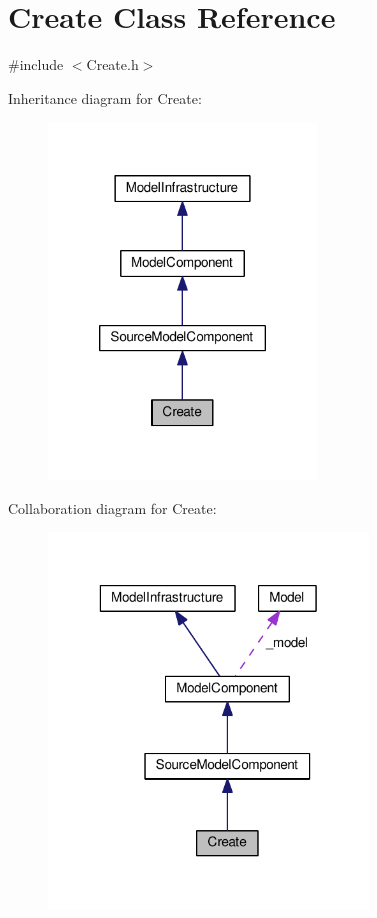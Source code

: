 \hypertarget{class_create}{\section{Create Class Reference}
\label{class_create}
}


{\ttfamily \#include $<$Create.\-h$>$}



Inheritance diagram for Create\-:
\nopagebreak
\begin{figure}[H]
\begin{center}
\leavevmode
\includegraphics[width=202pt]{class_create__inherit__graph}
\end{center}
\end{figure}


Collaboration diagram for Create\-:
\nopagebreak
\begin{figure}[H]
\begin{center}
\leavevmode
\includegraphics[width=241pt]{class_create__coll__graph}
\end{center}
\end{figure}
